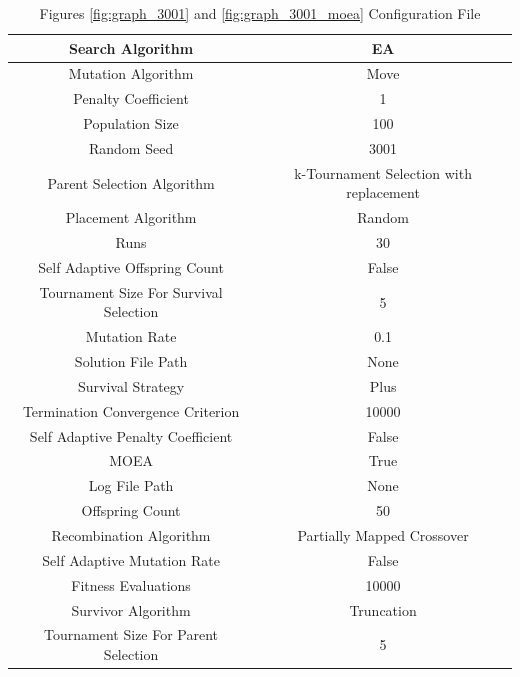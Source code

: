 \documentclass{standalone}
\begin{document}
\begin{table}[!htb]
	\centering
	\caption{Figures \ref{fig:graph_3001} and \ref{fig:graph_3001_moea} Configuration File}
	\label{tab:graph_3001}
	\begin{tabular}{| c | c |}
		\hline
		Search Algorithm		& EA		 \\
		\hline
		Mutation Algorithm		& Move		 \\
		\hline
		Penalty Coefficient		& 1		 \\
		\hline
		Population Size		& 100		 \\
		\hline
		Random Seed		& 3001		 \\
		\hline
		Parent Selection Algorithm		& k-Tournament Selection with replacement		 \\
		\hline
		Placement Algorithm		& Random		 \\
		\hline
		Runs		& 30		 \\
		\hline
		Self Adaptive Offspring Count		& False		 \\
		\hline
		Tournament Size For Survival Selection		& 5		 \\
		\hline
		Mutation Rate		& 0.1		 \\
		\hline
		Solution File Path		& None		 \\
		\hline
		Survival Strategy		& Plus		 \\
		\hline
		Termination Convergence Criterion		& 10000		 \\
		\hline
		Self Adaptive Penalty Coefficient		& False		 \\
		\hline
		MOEA		& True		 \\
		\hline
		Log File Path		& None		 \\
		\hline
		Offspring Count		& 50		 \\
		\hline
		Recombination Algorithm		& Partially Mapped Crossover		 \\
		\hline
		Self Adaptive Mutation Rate		& False		 \\
		\hline
		Fitness Evaluations		& 10000		 \\
		\hline
		Survivor Algorithm		& Truncation		 \\
		\hline
		Tournament Size For Parent Selection		& 5		 \\
		\hline
	\end{tabular}
\end{table}
\end{document}
